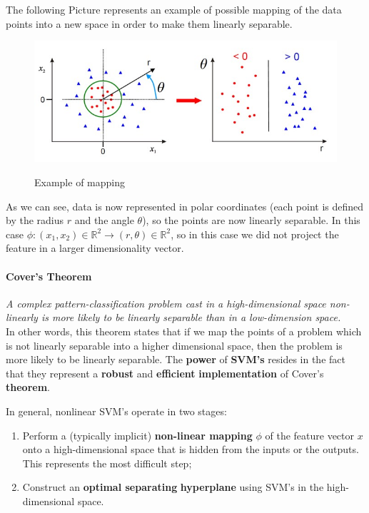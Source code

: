 \begin{exmp}
The following Picture represents an example of possible mapping of the data points into a new space in order to make them linearly separable.
    \begin{figure}[h!]
		\centering
		\includegraphics[scale = 1.5]{img/example of transformation.jpg}
		\label{svm}
		\caption{Example of mapping}
\end{figure}

As we can see, data is now represented in polar coordinates (each point is defined by the radius $r$ and the angle $\theta$), so the points are now linearly separable. In this case $\phi : (x_1, x_2)  \in \mathbb{R}^2 \to (r,\theta) \in \mathbb{R}^2$, so in this case we did not project the feature in a larger dimensionality vector.

\end{exmp}

\paragraph{Cover's Theorem} \textit{A complex pattern-classification problem cast in a high-dimensional space non-linearly is more likely to be linearly separable than in a low-dimension space.}\\

In other words, this theorem states that if we map the points of a problem which is not linearly separable into a higher dimensional space, then the problem is more likely to be linearly separable. The \textbf{power} of\textbf{ SVM's} resides in the fact that they represent a \textbf{robust} and \textbf{efficient} \textbf{implementation} of Cover's \textbf{theorem}.

In general, nonlinear SVM's operate in two stages:

\begin{enumerate}
    \item Perform a (typically implicit) \textbf{non-linear mapping} $\phi$ of the feature vector $x$ onto a high-dimensional space that is hidden from the inputs or the outputs. This represents the most difficult step;
    \item Construct an \textbf{optimal separating} \textbf{hyperplane} using SVM's in the high-dimensional space.
\end{enumerate}

